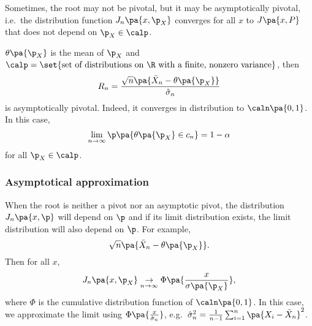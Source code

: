 Sometimes, the root may not be pivotal, but it may be asymptotically pivotal, i.e.~the distribution function $J_n\pa{x,\p_X}$ converges for all $x$ to $J\pa{x,P}$ that does not depend on $\p_X\in \calp$.
\begin{example}
  $\theta\pa{\p_X}$ is the mean of $\p_X$ and $\calp = \set{\text{set of distributions on }\R\text{ with a finite, nonzero variance}}$, then
  \begin{equation}
    R_n = \frac{\sqrt{n}\pa{\bar{X}_n - \theta\pa{\p_X}}}{\hat{\sigma}_n}
  \end{equation}
  is asymptotically pivotal. Indeed, it converges in distribution to $\caln\pa{0,1}$. In this case,
  \begin{equation}
    \lim_{n\rightarrow \infty} \p\pa{\theta\pa{\p_X}\in c_n} = 1-\alpha
  \end{equation}
  for all $\p_X\in \calp$.
\end{example}

\subsubsection{Asymptotical approximation}
When the root is neither a pivot nor an asymptotic pivot, the distribution $J_n\pa{x,\p}$ will depend on $\p$ and if its limit distribution exists, the limit distribution will also depend on $\p$. For example,
\begin{equation}
  \sqrt{n} \pa{\bar{X}_n - \theta\pa{\p_X}}.
\end{equation}
Then for all $x$,
\begin{equation}
  J_n \pa{x,\p_X} \underset{n\rightarrow \infty}{\rightarrow} \Phi\pa{\frac{x}{\sigma \pa{\p_X}}},
\end{equation}
where $\Phi$ is the cumulative distribution function of $\caln\pa{0,1}$. In this case, we approximate the limit using $\Phi\pa{\frac{x}{\hat{\sigma}_n}}$, e.g.~$\hat{\sigma}_n^2 = \frac{1}{n-1}\sum_{i=1}^n \pa{X_i - \bar{X}_n}^2$.

